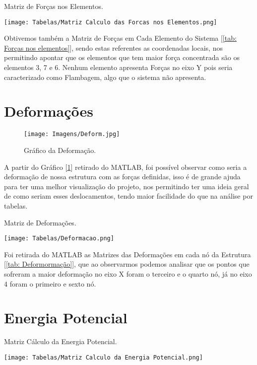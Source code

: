 \documentclass[deposito, acronym, symbols]{fei}
\begin{document}
\begin{table}[!htb]
 \centering
    \caption{Matriz de Forças nos Elementos.}
    \texttt{[image: Tabelas/Matriz Calculo das Forcas nos Elementos.png]}
    \label{tab: Forças nos elementos}
 \end{table}

Obtivemos também a Matriz de Forças em Cada Elemento do Sistema [\ref{tab: Forças nos elementos}], sendo estas referentes as coordenadas locais, nos permitindo apontar que os elementos que tem maior força concentrada são os elementos 3, 7 e 6. Nenhum elemento apresenta Forças no eixo Y pois seria caracterizado como Flambagem, algo que o sistema não apresenta.

\newpage
\section{Deformações}

\begin{figure}[!h]
 \centering
    \caption{Gráfico da Deformação.}
    \texttt{[image: Imagens/Deform.jpg]}
    \label{fig: Deformação}
 \end{figure}

A partir do Gráfico [\ref{fig: Deformação}] retirado do MATLAB, foi possível observar como seria a deformação de nossa estrutura com as forças definidas, isso é de grande ajuda para ter uma melhor visualização do projeto, nos permitindo ter uma ideia geral de como seriam esses deslocamentos, tendo maior facilidade do que na análise por tabelas.
 
\begin{table}[!htb]
 \centering
    \caption{Matriz de Deformações.}
    \texttt{[image: Tabelas/Deformacao.png]}
    \label{tab: Deformormação}
 \end{table}

Foi retirada do MATLAB as Matrizes das Deformações em cada nó da Estrutura [\ref{tab: Deformormação}], que ao observarmos podemos analisar que os pontos que sofreram a maior deformação no eixo X foram o terceiro e o quarto nó, já no eixo 4 foram o primeiro e sexto nó. 

\section{Energia Potencial}

\begin{table}[!htb]
 \centering
    \caption{Matriz Cálculo da Energia Potencial.}
    \texttt{[image: Tabelas/Matriz Calculo da Energia Potencial.png]}
    \label{tab: Energia Potencial}
 \end{table}
\end{document}
